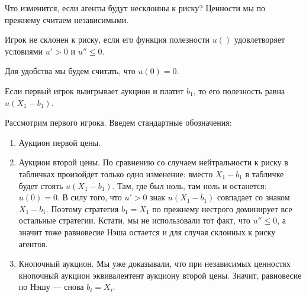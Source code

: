 Что изменится, если агенты будут несклонны к риску? Ценности мы по прежнему считаем независимыми.

\begin{mydef}
Игрок не склонен к риску, если его функция полезности $ u() $ удовлетворяет условиями $ u'>0 $ и $ u''\leq 0 $.
\end{mydef}

Для удобства мы будем считать, что $ u(0)=0 $.

Если первый игрок выигрывает аукцион и платит $ b_{1} $, то его полезность равна $u(X_{1}-b_{1})$.

Рассмотрим первого игрока. Введем стандартные обозначения:

\begin{enumerate}
\item Аукцион первой цены.




\item Аукцион второй цены.
По сравнению со случаем нейтральности к риску в табличках произойдет только одно изменение: вместо $ X_{1}-b_{1} $ в табличке будет стоять $ u(X_{1}-b_{1}) $. Там, где был ноль, там ноль и останется: $ u(0)=0 $. В силу того, что $ u'>0 $ знак $ u(X_{1}-b_{1}) $ совпадает со знаком $ X_{1}-b_{1} $. Поэтому стратегия $ b_{1}=X_{1} $ по прежнему нестрого доминирует все остальные стратегии. Кстати, мы не использовали  тот факт, что $u''\leq 0 $, а значит тоже равновесие Нэша остается и для случая склонных к риску агентов.


\item Кнопочный аукцион.
Мы уже доказывали, что при независимых ценностях кнопочный аукцион эквивалентент аукциону второй цены. Значит, равновесие по Нэшу --- снова $ b_{i}=X_{i} $.
\end{enumerate}




